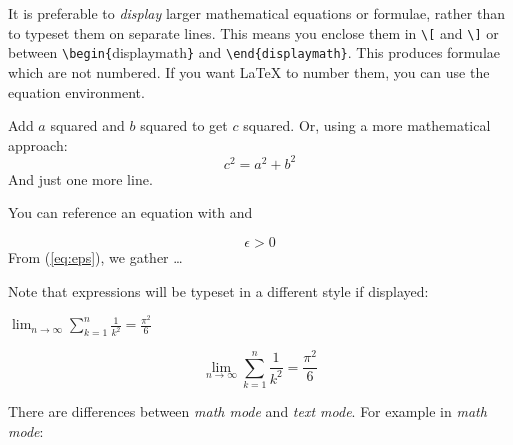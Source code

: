 It is preferable to \emph{display} larger mathematical equations or formulae,
rather than to typeset them on separate lines. This means you enclose them
in \verb|\[|  and \verb|\]|  or between
\verb|\begin{|displaymath\verb|}| and
  \verb|\end{displaymath}|.  This produces formulae which are not
numbered. If you want \LaTeX{} to number them, you can use the
equation environment.


\begin{singlespace}
\begin{example}
Add $a$ squared and $b$ squared 
to get $c$ squared. Or, using 
a more mathematical approach:
\begin{displaymath}
c^{2}=a^{2}+b^{2}
\end{displaymath}
And just one more line.
\end{example}
\end{singlespace}

You can reference an equation with  and 

\begin{singlespace}
\begin{example}
\begin{equation} \label{eq:eps}
\epsilon > 0
\end{equation}
From (\ref{eq:eps}), we gather 
\ldots
\end{example}
\end{singlespace}

Note that expressions will be typeset in a different style if displayed:

\begin{singlespace}
\begin{example}
$\lim_{n \to \infty} 
\sum_{k=1}^n \frac{1}{k^2} 
= \frac{\pi^2}{6}$
\end{example}
\end{singlespace}
\begin{singlespace}
\begin{example}
\begin{displaymath}
\lim_{n \to \infty} 
\sum_{k=1}^n \frac{1}{k^2} 
= \frac{\pi^2}{6}
\end{displaymath}
\end{example}
\end{singlespace}

There are differences between \emph{math mode} and \emph{text mode}. For
example in \emph{math mode}: 

